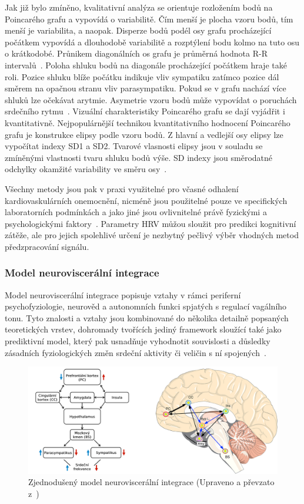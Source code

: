 Jak již bylo zmíněno, kvalitativní analýza se orientuje rozložením bodů na
Poincarého grafu a vypovídá o variabilitě. Čím menší je plocha vzoru bodů, tím
menší je variabilita, a naopak. Disperze bodů podél osy grafu procházející
počátkem vypovídá a dlouhodobě variabilitě a rozptýlení bodu kolmo na tuto osu o
krátkodobé. Průnikem diagonálních os grafu je průměrná hodnota R-R
intervalů~\cite{Hejjel2001}. Poloha shluku bodů na diagonále procházející
počátkem hraje také roli. Pozice shluku blíže počátku indikuje vliv sympatiku
zatímco pozice dál směrem na opačnou stranu vliv parasympatiku. Pokud se v grafu
nachází více shluků lze očekávat arytmie. Asymetrie vzoru bodů může vypovídat o
poruchách srdečního rytmu~\cite{Habib2013}. Vizuální charakteristiky Poincarého
grafu se dají vyjádřit i kvantitativně. Nejpopulárnější technikou
kvantitativního hodnocení Poincarého grafu je konstrukce elipsy podle vzoru
bodů. Z hlavní a vedlejší osy elipsy lze vypočítat indexy SD1 a SD2. Tvarové
vlasnosti elipsy jsou v souladu se zmíněnými vlastnosti tvaru shluku bodů výše.
SD indexy jsou směrodatné odchylky okamžité variability ve směru
osy~\cite{Habib2013,Mazhar2007}.

Všechny metody jsou pak v praxi využitelné pro včasné odhalení
kardiovaskulárních onemocnění, nicméně jsou použitelné pouze ve specifických
laboratorních podmínkách a jako jiné jsou ovlivnitelné právě fyzickými a
psychologickými faktory~\cite{Habib2013,Kubickova2016}. Parametry HRV můžou
sloužit pro predikci kognitivní zátěže, ale pro jejich spolehlivé určení je
nezbytný pečlivý výběr vhodných metod předzpracování signálu.

\subsubsection{Model neuroviscerální integrace}
Model neuroviscerální integrace popisuje vztahy v rámci periferní
psychofyziologie, neurověd a autonomních funkci spjatých s regulací vagálního
tonu. Tyto znalosti a vztahy jsou kombinované do několika detailně popsaných
teoretických vrstev, dohromady tvořících jediný framework sloužící také jako
prediktivní model, který pak usnadňuje vyhodnotit souvislosti a důsledky
zásadních fyziologických změn srdeční aktivity či veličin s ní
spojených~\cite{Smith2017}.

\begin{figure}[h]
	\begin{center}
		\includegraphics[width=1\textwidth]{../assets/diagrams/nvi}
		\caption{Zjednodušený model neuroviscerální integrace (Upraveno a převzato z~\cite{NVI20017})}
		\label{fig:nvi_model}
	\end{center}
\end{figure}

